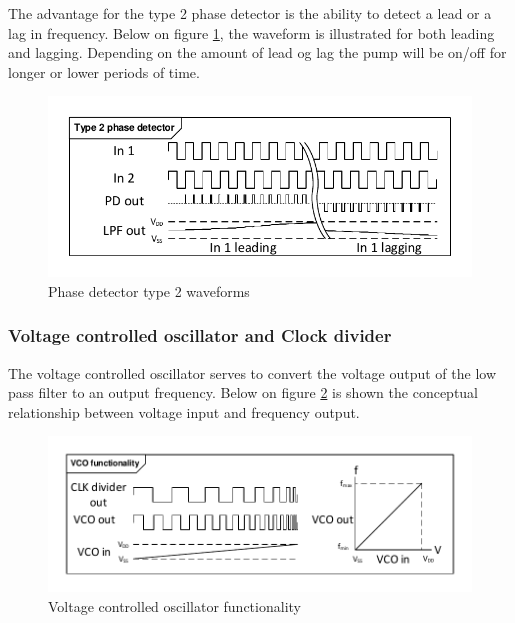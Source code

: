 The advantage for the type 2 phase detector is the ability to detect a lead or a lag in frequency. Below on figure \ref{fig:pd2_waveform}, the waveform is illustrated for both leading and lagging. Depending on the amount of lead og lag the pump will be on/off for longer or lower periods of time.

\begin{figure}[H]
	\centering
	\includegraphics[width=1\textwidth]{billeder/10technologystudies/pd2_waveform}
	\caption{Phase detector type 2 waveforms}
	\label{fig:pd2_waveform}
\end{figure}

\subsubsection{Voltage controlled oscillator and Clock divider}
The voltage controlled oscillator serves to convert the voltage output of the low pass filter to an output frequency. Below on figure \ref{fig:VCO_func} is shown the conceptual relationship between voltage input and frequency output.

\begin{figure}[H]
	\centering
	\includegraphics[width=1\textwidth]{billeder/10technologystudies/VCO_functionality}
	\caption{Voltage controlled oscillator functionality}
	\label{fig:VCO_func}
\end{figure}



